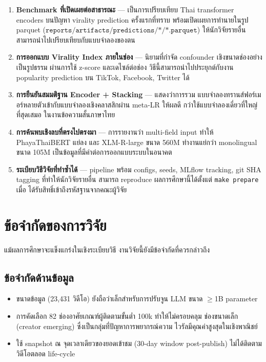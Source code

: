 \begin{enumerate}[leftmargin=2em]
  \item \textbf{Benchmark ที่เปิดเผยต่อสาธารณะ} — เป็นการเปรียบเทียบ Thai
        transformer encoders บนปัญหา virality prediction ครั้งแรกที่ทราบ
        พร้อมเปิดเผยการทำนายในรูป parquet ($\texttt{reports/artifacts/predictions/*/*.parquet}$)
        ให้นักวิจัยรายอื่นสามารถนำไปเปรียบเทียบกับแบบจำลองของตน
  \item \textbf{การออกแบบ Virality Index ภายในช่อง} — นิยามที่กำจัด confounder
        เชิงขนาดช่องอย่างเป็นรูปธรรม ผ่านการใช้ z-score และเดไซล์ต่อช่อง
        วิธีนี้สามารถนำไปประยุกต์กับงาน popularity prediction บน TikTok,
        Facebook, Twitter ได้
  \item \textbf{การยืนยันสมมติฐาน Encoder + Stacking} — แสดงว่าการรวม
        แบบจำลองทรานส์ฟอร์เมอร์หลายตัวเข้ากับแบบจำลองเชิงคลาสสิกผ่าน meta-LR ให้ผลดี
        กว่าใช้แบบจำลองเดี่ยวที่ใหญ่ที่สุดเสมอ ในงานข้อความสั้นภาษาไทย
  \item \textbf{การค้นพบเชิงลบที่ตรงไปตรงมา} — การรายงานว่า multi-field input
        ทำให้ PhayaThaiBERT แย่ลง และ XLM-R-large ขนาด 560M ทำงานแย่กว่า
        monolingual ขนาด 105M เป็นข้อมูลที่มีค่าต่อการออกแบบระบบในอนาคต
  \item \textbf{ระเบียบวิธีวิจัยที่ทำซ้ำได้} — pipeline พร้อม
        configs, seeds, MLflow tracking, git SHA tagging ที่ทำให้นักวิจัยรายอื่น
        สามารถ reproduce ผลการศึกษานี้ได้ตั้งแต่ \texttt{make prepare} เมื่อ
        ได้รับสิทธิ์เข้าถึงรหัสฐานจากคณะผู้วิจัย
\end{enumerate}

\section{ข้อจำกัดของการวิจัย}
\label{sec:conclusion-limitations}

แม้ผลการศึกษาจะแข็งแกร่งในเชิงระเบียบวิธี งานวิจัยนี้ยังมีข้อจำกัดที่ควรกล่าวถึง

\subsection{ข้อจำกัดด้านข้อมูล}
\begin{itemize}[leftmargin=2em]
  \item ขนาดข้อมูล (23{,}431 วิดีโอ) ยังถือว่าเล็กสำหรับการปรับจูน LLM ขนาด
        $\geq$1B parameter
  \item การคัดเลือก 82 ช่องอาศัยเกณฑ์ผู้ติดตามขั้นต่ำ 100k ทำให้ไม่ครอบคลุม
        ช่องขนาดเล็ก (creator emerging) ซึ่งเป็นกลุ่มที่ปัญหาการพยากรณ์ความ
        ไวรัลมีคุณค่าสูงสุดในเชิงพาณิชย์
  \item ใช้ snapshot ณ จุดเวลาเดียวของยอดเข้าชม (30-day window post-publish)
        ไม่ได้ติดตามวิดีโอตลอด life-cycle
\end{itemize}

